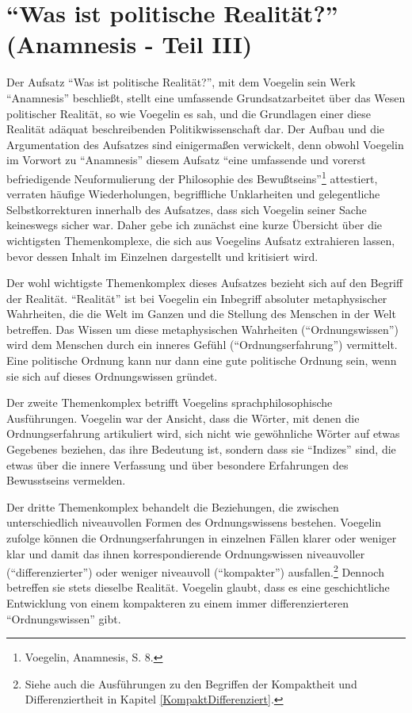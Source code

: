 
\chapter{"`Was ist politische Realität?"' (Anamnesis - Teil III)}  
\label{politischeRealitaet}

Der Aufsatz "`Was ist politische Realität?"', mit dem Voegelin sein Werk
"`Anamnesis"' beschließt, stellt eine umfassende Grundsatzarbeitet über das
Wesen politischer Realität, so wie Voegelin es sah, und die Grundlagen einer
diese Realität adäquat beschreibenden Politikwissenschaft dar. Der Aufbau und
die Argumentation des Aufsatzes sind einigermaßen verwickelt, denn obwohl
Voegelin im Vorwort zu "`Anamnesis"' diesem Aufsatz "`eine umfassende und
vorerst befriedigende Neuformulierung der Philosophie des
Bewußtseins"'\footnote{Voegelin, Anamnesis, S. 8.} attestiert, verraten häufige
Wiederholungen, begriffliche Unklarheiten und gelegentliche Selbstkorrekturen
innerhalb des Aufsatzes, dass sich Voegelin seiner Sache keineswegs sicher
war.  Daher gebe ich zunächst eine kurze Übersicht über die wichtigsten
Themenkomplexe, die sich aus Voegelins Aufsatz extrahieren lassen, bevor
dessen Inhalt im Einzelnen dargestellt und kritisiert wird.

Der wohl wichtigste Themenkomplex dieses Aufsatzes bezieht sich auf den
Begriff der Realität. "`Realität"' ist bei Voegelin ein Inbegriff
absoluter metaphysischer Wahrheiten, die die Welt im Ganzen und die Stellung
des Menschen in der Welt betreffen.  Das Wissen um diese metaphysischen
Wahrheiten ("`Ordnungswissen"') wird dem Menschen durch ein inneres Gefühl
("`Ordnungserfahrung"') vermittelt. Eine politische Ordnung kann nur dann eine
gute politische Ordnung sein, wenn sie sich auf dieses Ordnungswissen
gründet.

Der zweite Themenkomplex betrifft Voegelins sprachphilosophische
Ausführungen.  Voegelin war der Ansicht, dass die Wörter, mit denen die
Ordnungserfahrung artikuliert wird, sich nicht wie gewöhnliche Wörter
auf etwas Gegebenes beziehen, das ihre Bedeutung ist, sondern dass sie
"`Indizes"' sind, die etwas über die innere Verfassung und über
besondere Erfahrungen des Bewusstseins vermelden.

Der dritte Themenkomplex behandelt die Beziehungen, die zwischen
unterschiedlich niveauvollen Formen des Ordnungswissens bestehen. Voegelin
zufolge können die Ordnungserfahrungen in einzelnen Fällen klarer oder weniger
klar und damit das ihnen korrespondierende Ordnungswissen niveauvoller
("`differenzierter"') oder weniger niveauvoll ("`kompakter"')
ausfallen.\footnote{Siehe auch die Ausführungen zu den Begriffen der
  Kompaktheit und Differenziertheit in Kapitel \ref{KompaktDifferenziert}.}
Dennoch betreffen sie stets dieselbe Realität. Voegelin glaubt, dass es eine
geschichtliche Entwicklung von einem kompakteren zu einem immer
differenzierteren "`Ordnungswissen"' gibt.


